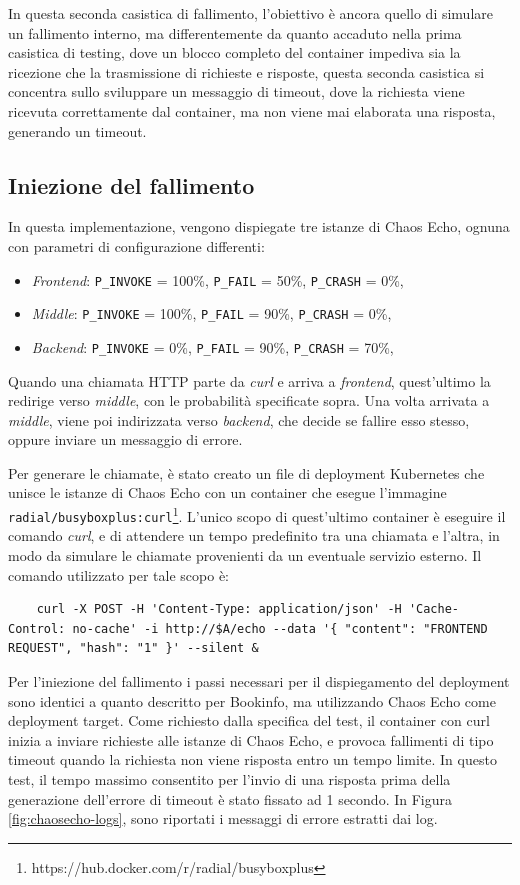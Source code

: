 In questa seconda casistica di fallimento, l'obiettivo è ancora quello di simulare un fallimento interno, ma differentemente da quanto accaduto nella prima casistica di testing, dove un blocco completo del container impediva sia la ricezione che la trasmissione di richieste e risposte, questa seconda casistica si concentra sullo sviluppare un messaggio di timeout, dove la richiesta viene ricevuta correttamente dal container, ma non viene mai elaborata una risposta, generando un timeout.

\subsection{Iniezione del fallimento}

In questa implementazione, vengono dispiegate tre istanze di Chaos Echo, ognuna con parametri di configurazione differenti:
\begin{itemize}
    \item \textit{Frontend}: \texttt{P\_INVOKE} = 100\%, \texttt{P\_FAIL} = 50\%, \texttt{P\_CRASH} = 0\%, 
    \item \textit{Middle}: \texttt{P\_INVOKE} = 100\%, \texttt{P\_FAIL} = 90\%, \texttt{P\_CRASH} = 0\%, 
    \item \textit{Backend}: \texttt{P\_INVOKE} = 0\%, \texttt{P\_FAIL} = 90\%, \texttt{P\_CRASH} = 70\%, 
\end{itemize}

Quando una chiamata HTTP parte da \textit{curl} e arriva a \textit{frontend}, quest'ultimo la redirige verso \textit{middle}, con le probabilità specificate sopra. Una volta arrivata a \textit{middle}, viene poi indirizzata verso \textit{backend}, che decide se fallire esso stesso, oppure inviare un messaggio di errore.

Per generare le chiamate, è stato creato un file di deployment Kubernetes che unisce le istanze di Chaos Echo con un container che esegue l'immagine \texttt{radial/busyboxplus:curl}\footnote{https://hub.docker.com/r/radial/busyboxplus}. L'unico scopo di quest'ultimo container è eseguire il comando \textit{curl}, e di attendere un tempo predefinito tra una chiamata e l'altra, in modo da simulare le chiamate provenienti da un eventuale servizio esterno.
Il comando utilizzato per tale scopo è:
\begin{lstlisting}
    curl -X POST -H 'Content-Type: application/json' -H 'Cache-Control: no-cache' -i http://$A/echo --data '{ "content": "FRONTEND REQUEST", "hash": "1" }' --silent & 
\end{lstlisting}
Per l'iniezione del fallimento i passi necessari per il dispiegamento del deployment sono identici a quanto descritto per Bookinfo, ma utilizzando Chaos Echo come deployment target. Come richiesto dalla specifica del test, il container con curl inizia a inviare richieste alle istanze di Chaos Echo, e provoca fallimenti di tipo timeout quando la richiesta non viene risposta entro un tempo limite. In questo test, il tempo massimo consentito per l'invio di una risposta prima della generazione dell'errore di timeout è stato fissato ad 1 secondo. In Figura \ref{fig:chaosecho-logs}, sono riportati i messaggi di errore estratti dai log.

